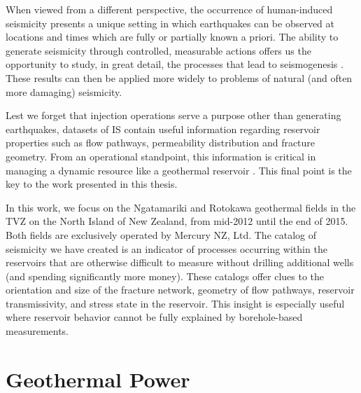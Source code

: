 When viewed from a different perspective, the occurrence of human-induced seismicity presents a unique setting in which earthquakes can be observed at locations and times which are fully or partially known a priori. The ability to generate seismicity through controlled, measurable actions  offers us the opportunity to study, in great detail, the processes that lead to seismogenesis \citep[e.g.][]{Raleigh_1976}. These results can then be applied more widely to problems of natural (and often more damaging) seismicity.

Lest we forget that injection operations serve a purpose other than generating earthquakes, datasets of IS contain useful information regarding reservoir properties such as flow pathways, \gls{permeability} distribution and fracture geometry. From an operational standpoint, this information is critical in managing a dynamic resource like a geothermal reservoir \citep{Majer_2007}. This final point is the key to the work presented in this thesis.

In this work, we focus on the Ngatamariki and Rotokawa geothermal fields in the \acrfull{TVZ} on the North Island of New Zealand, from mid-2012 until the end of 2015. Both fields are exclusively operated by Mercury NZ, Ltd. The catalog of seismicity we have created is an indicator of processes occurring within the reservoirs that are otherwise difficult to measure without drilling additional wells (and spending significantly more money). These catalogs offer clues to the orientation and size of the fracture network, geometry of flow pathways, reservoir \gls{transmissivity}, and stress state in the reservoir. This insight is especially useful where reservoir behavior cannot be fully explained by borehole-based measurements.

\section{Geothermal Power}
